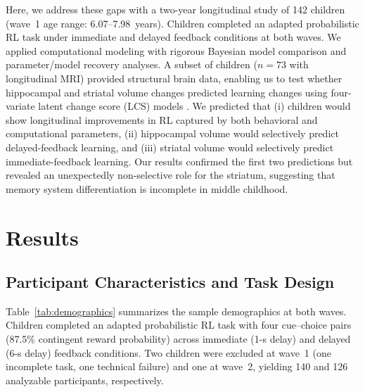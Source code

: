 \documentclass[11pt]{article}
\begin{document}
Here, we address these gaps with a two-year longitudinal study of 142 children (wave~1 age range: 6.07--7.98~years). Children completed an adapted probabilistic RL task under immediate and delayed feedback conditions at both waves. We applied computational modeling with rigorous Bayesian model comparison and parameter/model recovery analyses. A subset of children ($n = 73$ with longitudinal MRI) provided structural brain data, enabling us to test whether hippocampal and striatal volume changes predicted learning changes using four-variate latent change score (LCS) models \citep{mcardle2009latent}. We predicted that (i) children would show longitudinal improvements in RL captured by both behavioral and computational parameters, (ii) hippocampal volume would selectively predict delayed-feedback learning, and (iii) striatal volume would selectively predict immediate-feedback learning. Our results confirmed the first two predictions but revealed an unexpectedly non-selective role for the striatum, suggesting that memory system differentiation is incomplete in middle childhood.

\section{Results}

\subsection{Participant Characteristics and Task Design}

Table~\ref{tab:demographics} summarizes the sample demographics at both waves. Children completed an adapted probabilistic RL task with four cue--choice pairs (87.5\% contingent reward probability) across immediate (1-s delay) and delayed (6-s delay) feedback conditions. Two children were excluded at wave~1 (one incomplete task, one technical failure) and one at wave~2, yielding 140 and 126 analyzable participants, respectively.
\end{document}
